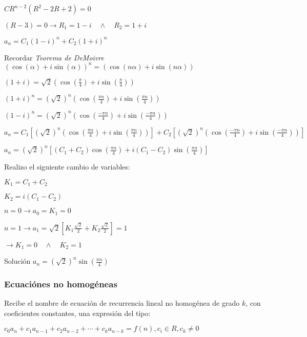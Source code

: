 \documentclass[a4paper, twoside]{article}
\begin{document}
\begin{itemize}
			$C R^{n-2} \left(R^2 - 2 R + 2 \right) = 0$
			
			$\left(R - 3 \right) = 0 \rightarrow R_1=1-i \quad \wedge \quad R_2 =1+i$
			
			$a_n= C_1 (1-i)^n + C_2 (1+i)^n$
			
			Recordar \emph{Teorema de DeMoivre} $( \cos(\alpha) + i \sin( \alpha))^n = ( \cos(n \alpha) + i \sin(n \alpha))$
			
			$(1+i) = \sqrt{2} \left(\cos(\frac{\pi}{4}) + i \sin(\frac{\pi}{4}) \right)$
			
			$(1+i)^n = (\sqrt{2})^n \left(\cos(\frac{\pi n}{4}) + i \sin(\frac{\pi n}{4}) \right)$
			
			$(1-i)^n = (\sqrt{2})^n \left(\cos(\frac{ - \pi n}{4}) + i \sin(\frac{- \pi n}{4}) \right)$
			
			$a_n = C_1 \left[(\sqrt{2})^n \left(\cos(\frac{\pi n}{4}) + i \sin(\frac{\pi n}{4}) \right) \right] + C_2 \left[ (\sqrt{2})^n \left(\cos(\frac{ - \pi n}{4}) + i \sin(\frac{- \pi n}{4}) \right)\right]$ 
	
			$a_n = (\sqrt{2})^n \left[ (C_1 + C_2) \cos(\frac{\pi n}{4}) + i (C_1 - C_2) \sin(\frac{\pi n}{4}) \right]$
		
			Realizo el siguiente cambio de variables:
			
			$K_1 = C_1 + C_2$
			
			$K_2 = i (C_1 - C_2)$
			
			$n=0 \rightarrow a_0 = K_1 = 0$
			
			$n=1 \rightarrow a_1 = \sqrt{2} \left[K_1 \frac{\sqrt{2}}{2} + K_2 \frac{\sqrt{2}}{2}\right] = 1$
			
			$\rightarrow K_1 = 0 \quad \wedge \quad K_2 =1$
			
			Solución $a_n = (\sqrt{2})^n \sin(\frac{\pi n}{4})$
		\end{itemize}

	\subsubsection{Ecuaciónes no homogéneas}
	Recibe el nombre de ecuación de recurrencia lineal no homogénea de grado $k$, con coeficientes constantes, una expresión del tipo:
	
	\begin{center}
			$c_0a_n + c_1a_{n-1} + c_2a_{n-2} +\cdots+ c_ka_{n-k} =f(n) , c_i\in R , c_k \ne 0$
	\end{center}
	
\end{document}

